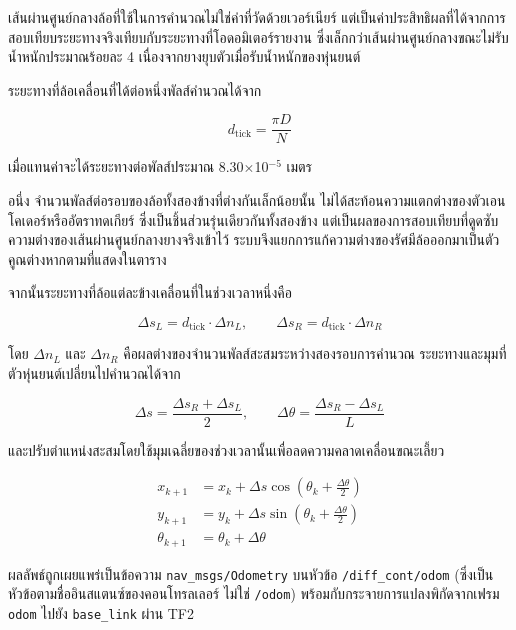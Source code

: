 \documentclass[a4paper,12pt]{report}
\begin{document}
เส้นผ่านศูนย์กลางล้อที่ใช้ในการคำนวณไม่ใช่ค่าที่วัดด้วยเวอร์เนียร์
แต่เป็นค่าประสิทธิผลที่ได้จากการสอบเทียบระยะทางจริงเทียบกับระยะทางที่โอดอมิเตอร์รายงาน
ซึ่งเล็กกว่าเส้นผ่านศูนย์กลางขณะไม่รับน้ำหนักประมาณร้อยละ 4
เนื่องจากยางยุบตัวเมื่อรับน้ำหนักของหุ่นยนต์

ระยะทางที่ล้อเคลื่อนที่ได้ต่อหนึ่งพัลส์คำนวณได้จาก

\begin{equation}
d_{\text{tick}} = \frac{\pi D}{N}
\end{equation}

เมื่อแทนค่าจะได้ระยะทางต่อพัลส์ประมาณ 8.30$\times$10$^{-5}$ เมตร

อนึ่ง จำนวนพัลส์ต่อรอบของล้อทั้งสองข้างที่ต่างกันเล็กน้อยนั้น
ไม่ได้สะท้อนความแตกต่างของตัวเอนโคเดอร์หรืออัตราทดเกียร์
ซึ่งเป็นชิ้นส่วนรุ่นเดียวกันทั้งสองข้าง
แต่เป็นผลของการสอบเทียบที่ดูดซับความต่างของเส้นผ่านศูนย์กลางยางจริงเข้าไว้
ระบบจึงแยกการแก้ความต่างของรัศมีล้อออกมาเป็นตัวคูณต่างหากตามที่แสดงในตาราง

จากนั้นระยะทางที่ล้อแต่ละข้างเคลื่อนที่ในช่วงเวลาหนึ่งคือ

\begin{equation}
\Delta s_L = d_{\text{tick}} \cdot \Delta n_L, \qquad
\Delta s_R = d_{\text{tick}} \cdot \Delta n_R
\end{equation}

โดย $\Delta n_L$ และ $\Delta n_R$ คือผลต่างของจำนวนพัลส์สะสมระหว่างสองรอบการคำนวณ
ระยะทางและมุมที่ตัวหุ่นยนต์เปลี่ยนไปคำนวณได้จาก

\begin{equation}
\Delta s = \frac{\Delta s_R + \Delta s_L}{2}, \qquad
\Delta \theta = \frac{\Delta s_R - \Delta s_L}{L}
\end{equation}

และปรับตำแหน่งสะสมโดยใช้มุมเฉลี่ยของช่วงเวลานั้นเพื่อลดความคลาดเคลื่อนขณะเลี้ยว

\begin{equation}
\begin{aligned}
x_{k+1} &= x_k + \Delta s \cos\left(\theta_k + \frac{\Delta \theta}{2}\right) \\
y_{k+1} &= y_k + \Delta s \sin\left(\theta_k + \frac{\Delta \theta}{2}\right) \\
\theta_{k+1} &= \theta_k + \Delta \theta
\end{aligned}
\end{equation}

ผลลัพธ์ถูกเผยแพร่เป็นข้อความ \texttt{nav\_msgs/Odometry}
บนหัวข้อ \texttt{/diff\_cont/odom}
(ซึ่งเป็นหัวข้อตามชื่ออินสแตนซ์ของคอนโทรลเลอร์ ไม่ใช่ \texttt{/odom})
พร้อมกับกระจายการแปลงพิกัดจากเฟรม \texttt{odom} ไปยัง \texttt{base\_link} ผ่าน TF2
\end{document}
